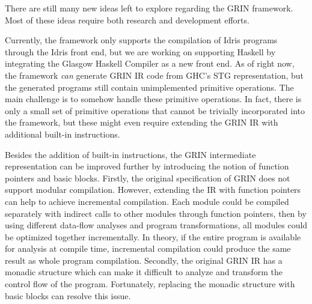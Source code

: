 \documentclass[main.tex]{subfiles}
\begin{document}
	
	There are still many new ideas left to explore regarding the GRIN framework. Most of these ideas require both research and development efforts.
	
	Currently, the framework only supports the compilation of Idris programs through the Idris front end, but we are working on supporting Haskell by integrating the Glasgow Haskell Compiler as a new front end. As of right now, the framework \emph{can} generate GRIN IR code from GHC's STG representation, but the generated programs still contain unimplemented primitive operations. The main challenge is to somehow handle these primitive operations. In fact, there is only a small set of primitive operations that cannot be trivially incorporated into the framework, but these might even require extending the GRIN IR with additional built-in instructions.
	
	Besides the addition of built-in instructions, the GRIN intermediate representation can be improved further by introducing the notion of function pointers and basic blocks. Firstly, the original specification of GRIN does not support modular compilation. However, extending the IR with function pointers can help to achieve incremental compilation. Each module could be compiled separately with indirect calls to other modules through function pointers, then by using different data-flow analyses and program transformations, all modules could be optimized together incrementally. In theory, if the entire program is available for analysis at compile time, incremental compilation could produce the same result as whole program compilation. Secondly, the original GRIN IR has a monadic structure which can make it difficult to analyze and transform the control flow of the program. Fortunately, replacing the monadic structure with basic blocks can resolve this issue.
	
\end{document}

